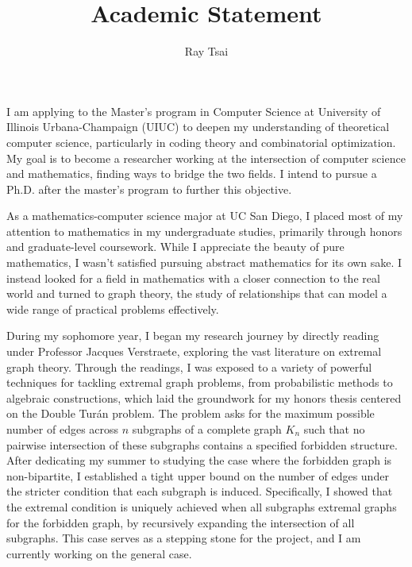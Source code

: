 \documentclass[12pt]{article}
\title{Academic Statement}
\author{Ray Tsai}
\date{}
\begin{document}
\maketitle

\vspace{-0.25in}

I am applying to the Master's program in Computer Science at University of Illinois Urbana-Champaign
(UIUC) to deepen my understanding of theoretical computer science, particularly in coding theory and
combinatorial optimization. My goal is to become a researcher working at the intersection of
computer science and mathematics, finding ways to bridge the two fields. I intend to pursue a Ph.D.
after the master's program to further this objective.

As a mathematics-computer science major at UC San Diego, I placed most of my attention to
mathematics in my undergraduate studies, primarily through honors and graduate-level coursework.
While I appreciate the beauty of pure mathematics, I wasn't satisfied pursuing abstract mathematics
for its own sake. I instead looked for a field in mathematics with a closer connection to the real
world and turned to graph theory, the study of relationships that can model a wide range of
practical problems effectively.

During my sophomore year, I began my research journey by directly reading under Professor Jacques
Verstraete, exploring the vast literature on extremal graph theory. Through the readings, I was
exposed to a variety of powerful techniques for tackling extremal graph problems, from probabilistic
methods to algebraic constructions, which laid the groundwork for my honors thesis centered on the
Double Turán problem. The problem asks for the maximum possible number of edges across $n$ subgraphs
of a complete graph $K_n$ such that no pairwise intersection of these subgraphs contains a specified
forbidden structure. After dedicating my summer to studying the case where the forbidden graph is
non-bipartite, I established a tight upper bound on the number of edges under the stricter condition
that each subgraph is induced. Specifically, I showed that the extremal condition is uniquely
achieved when all subgraphs extremal graphs for the forbidden graph, by recursively expanding the
intersection of all subgraphs. This case serves as a stepping stone for the project, and I am
currently working on the general case. 
\end{document}
